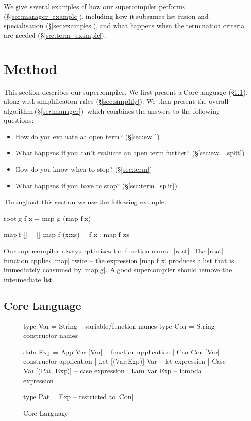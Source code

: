 \documentclass[draft]{sigplanconf}
\begin{document}
We give several examples of how our supercompiler performs (\S\ref{sec:manager_example}), including how it subsumes list fusion and specialisation (\S\ref{sec:examples}), and what happens when the termination criteria are needed (\S\ref{sec:term_example}).

\section{Method}
\label{sec:method}

This section describes our supercompiler. We first present a Core language (\S\ref{sec:core}), along with simplification rules (\S\ref{sec:simplify}). We then present the overall algorithm (\S\ref{sec:manager}), which combines the answers to the following questions:

\begin{itemize}
\item How do you evaluate an open term? (\S\ref{sec:eval})
\item What happens if you can't evaluate an open term further? (\S\ref{sec:eval_split})
\item How do you know when to stop? (\S\ref{sec:term})
\item What happens if you have to stop? (\S\ref{sec:term_split})
\end{itemize}

\noindent Throughout this section we use the following example:

\begin{code}
root g f x = map g (map f x)

map f []      = []
map f (x:xs)  = f x : map f xs
\end{code}

Our supercompiler always optimises the function named |root|. The |root| function applies |map| twice -- the expression |map f x| produces a list that is immediately consumed by |map g|. A good supercompiler should remove the intermediate list.

\subsection{Core Language}
\label{sec:core}

\begin{figure}
\begin{code}
type Var   =   String -- variable/function names
type Con   =   String -- constructor names

data Exp   =   App Var [Var]           -- function application
           |   Con Con [Var]           -- constructor application
           |   Let [(Var,Exp)] Var     -- let expression
           |   Case Var [(Pat, Exp)]   -- case expression
           |   Lam Var Exp             -- lambda expression

type Pat   =   Exp -- restricted to |Con|
\end{code}
\caption{Core Language}
\label{fig:core}
\end{figure}
\end{document}
